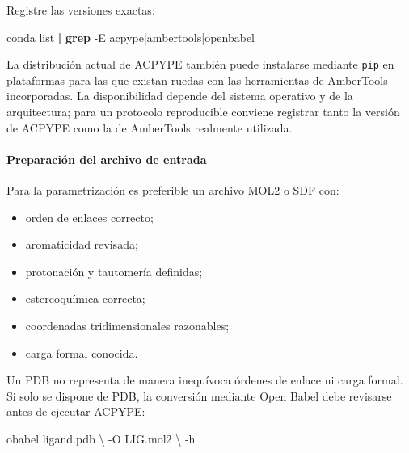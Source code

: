 \documentclass[
  spanish,
  11pt,
  a4paper]{article}
\newenvironment{Shaded}{\begin{snugshade}}{\end{snugshade}}
\newcommand{\AttributeTok}[1]{\textcolor[rgb]{0.13,0.29,0.53}{#1}}
\newcommand{\DataTypeTok}[1]{\textcolor[rgb]{0.13,0.29,0.53}{#1}}
\newcommand{\ExtensionTok}[1]{#1}
\newcommand{\FunctionTok}[1]{\textcolor[rgb]{0.13,0.29,0.53}{\textbf{#1}}}
\newcommand{\KeywordTok}[1]{\textcolor[rgb]{0.13,0.29,0.53}{\textbf{#1}}}
\newcommand{\NormalTok}[1]{#1}
\newcommand{\StringTok}[1]{\textcolor[rgb]{0.31,0.60,0.02}{#1}}
\providecommand{\tightlist}{%
  \setlength{\itemsep}{0pt}\setlength{\parskip}{0pt}}
\begin{document}
Registre las versiones exactas:

\begin{Shaded}
\begin{Highlighting}[]
\ExtensionTok{conda}\NormalTok{ list }\KeywordTok{|} \FunctionTok{grep} \AttributeTok{{-}E} \StringTok{\textquotesingle{}acpype|ambertools|openbabel\textquotesingle{}}
\end{Highlighting}
\end{Shaded}

La distribución actual de ACPYPE también puede instalarse mediante
\texttt{pip} en plataformas para las que existan ruedas con las
herramientas de AmberTools incorporadas. La disponibilidad depende del
sistema operativo y de la arquitectura; para un protocolo reproducible
conviene registrar tanto la versión de ACPYPE como la de AmberTools
realmente utilizada.

\paragraph{Preparación del archivo de
entrada}\label{preparaciuxf3n-del-archivo-de-entrada}

Para la parametrización es preferible un archivo MOL2 o SDF con:

\begin{itemize}
\tightlist
\item
  orden de enlaces correcto;
\item
  aromaticidad revisada;
\item
  protonación y tautomería definidas;
\item
  estereoquímica correcta;
\item
  coordenadas tridimensionales razonables;
\item
  carga formal conocida.
\end{itemize}

Un PDB no representa de manera inequívoca órdenes de enlace ni carga
formal. Si solo se dispone de PDB, la conversión mediante Open Babel
debe revisarse antes de ejecutar ACPYPE:

\begin{Shaded}
\begin{Highlighting}[]
\ExtensionTok{obabel}\NormalTok{ ligand.pdb }\DataTypeTok{\textbackslash{}}
    \AttributeTok{{-}O}\NormalTok{ LIG.mol2 }\DataTypeTok{\textbackslash{}}
    \AttributeTok{{-}h}
\end{Highlighting}
\end{Shaded}
\end{document}
